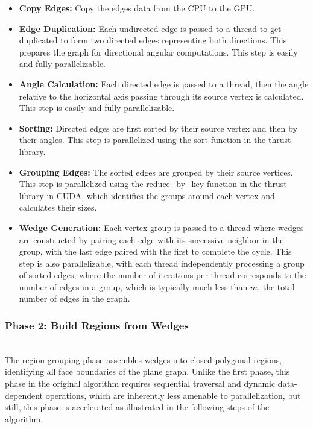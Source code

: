 \documentclass[conference]{IEEEtran}
\begin{document}
\begin{itemize}
    \item \textbf{Copy Edges:} Copy the edges data from the CPU to the GPU.
    \item \textbf{Edge Duplication:} Each undirected edge is passed to a thread to get duplicated to form two directed edges representing both directions. This prepares the graph for directional angular computations. This step is easily and fully parallelizable.
    \item \textbf{Angle Calculation:} Each directed edge is passed to a thread, then the angle relative to the horizontal axis passing through its source vertex is calculated. This step is easily and fully parallelizable.
    \item \textbf{Sorting:} Directed edges are first sorted by their source vertex and then by their angles. This step is parallelized using the sort function in the thrust library.
    \item \textbf{Grouping Edges:} The sorted edges are grouped by their source vertices. This step is parallelized using the reduce\_by\_key function in the thrust library in CUDA, which identifies the groups around each vertex and calculates their sizes.
    \item \textbf{Wedge Generation:} Each vertex group is passed to a thread where wedges are constructed by pairing each edge with its successive neighbor in the group, with the last edge paired with the first to complete the cycle. This step is also parallelizable, with each thread independently processing a group of sorted edges, where the number of iterations per thread corresponds to the number of edges in a group, which is typically much less than \(m\), the total number of edges in the graph.
\end{itemize}

\subsubsection{Phase 2: Build Regions from Wedges}\hfill\\
The region grouping phase assembles wedges into closed polygonal regions, identifying all face boundaries of the plane graph. Unlike the first phase, this phase in the original algorithm requires sequential traversal and dynamic data-dependent operations, which are inherently less amenable to parallelization, but still, this phase is accelerated as illustrated in the following steps of the algorithm.
\end{document}
